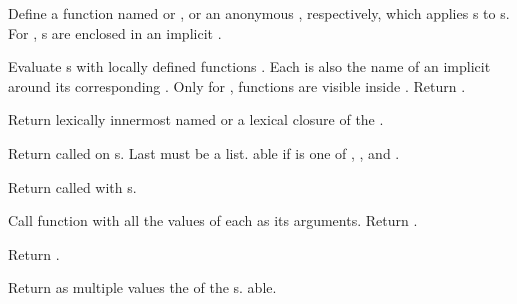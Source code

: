 \begin{LIST}{1cm}

  {
  Define a function named  or , or an anonymous , respectively, which applies
  s to s. For , s are
  enclosed in an implicit  .
  }

  {
  Evaluate s with
  locally defined functions . Each  is also the name
  of an implicit  around its corresponding
  .  Only for , functions  are visible inside . Return
  .
  }

  {
    Return lexically innermost  named  or a
    lexical closure of the .
  }

  {
  Return  called on
  s. Last  must be a list. able if
   is one of , , and .
  }

  {
  Return  called with s.
  }

  {Call function
   with all the values of each  as its arguments.  Return
  .
  }

  {
  Return .
  }

  {
  Return as multiple values the  of the
  s. able. 
  }


\end{LIST}
